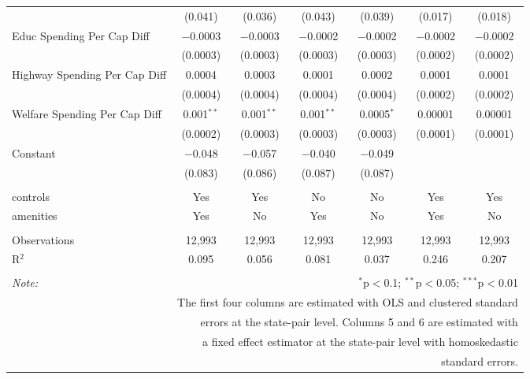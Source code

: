 \begin{table}[!htbp]
\begin{tabular}{@{\extracolsep{5pt}}lcccccc}
  & (0.041) & (0.036) & (0.043) & (0.039) & (0.017) & (0.018) \\ 
  Educ Spending Per Cap Diff & $-$0.0003 & $-$0.0003 & $-$0.0002 & $-$0.0002 & $-$0.0002 & $-$0.0002 \\ 
  & (0.0003) & (0.0003) & (0.0003) & (0.0003) & (0.0002) & (0.0002) \\ 
  Highway Spending Per Cap Diff & 0.0004 & 0.0003 & 0.0001 & 0.0002 & 0.0001 & 0.0001 \\ 
  & (0.0004) & (0.0004) & (0.0004) & (0.0004) & (0.0002) & (0.0002) \\ 
  Welfare Spending Per Cap Diff & 0.001$^{**}$ & 0.001$^{**}$ & 0.001$^{**}$ & 0.0005$^{*}$ & 0.00001 & 0.00001 \\ 
  & (0.0002) & (0.0003) & (0.0003) & (0.0003) & (0.0001) & (0.0001) \\ 
  Constant & $-$0.048 & $-$0.057 & $-$0.040 & $-$0.049 &  &  \\ 
  & (0.083) & (0.086) & (0.087) & (0.087) &  &  \\ 
 \hline \\[-1.8ex] 
controls & Yes & Yes & No & No & Yes & Yes \\ 
amenities & Yes & No & Yes & No & Yes & No \\ 
\hline \\[-1.8ex] 
Observations & 12,993 & 12,993 & 12,993 & 12,993 & 12,993 & 12,993 \\ 
R$^{2}$ & 0.095 & 0.056 & 0.081 & 0.037 & 0.246 & 0.207 \\ 
\hline 
\hline \\[-1.8ex] 
\textit{Note:}  & \multicolumn{6}{r}{$^{*}$p$<$0.1; $^{**}$p$<$0.05; $^{***}$p$<$0.01} \\ 
 & \multicolumn{6}{r}{The first four columns are estimated with OLS and clustered standard} \\ 
 & \multicolumn{6}{r}{ errors at the state-pair level. Columns 5 and 6 are estimated with} \\ 
 & \multicolumn{6}{r}{a fixed effect estimator at the state-pair level with homoskedastic} \\ 
 & \multicolumn{6}{r}{standard errors.} \\ 
\end{tabular} 
\end{table} 
